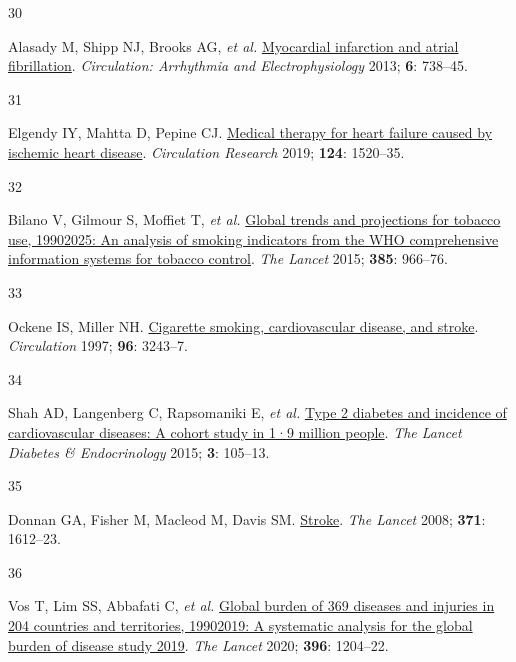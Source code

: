 \documentclass[
  a4paper,
  headsepline=true,
  open=any]{scrbook}
\newlength{\cslhangindent}
\newlength{\csllabelwidth}
\newlength{\cslentryspacingunit} %
\newenvironment{CSLReferences}[2] %
 {%
  \setlength{\parindent}{0pt}
  \ifodd #1
  \let\oldpar\par
  \def\par{\hangindent=\cslhangindent\oldpar}
  \fi
  \setlength{\parskip}{#2\cslentryspacingunit}
 }%
 {}
\newcommand{\CSLLeftMargin}[1]{\parbox[t]{\csllabelwidth}{#1}}
\newcommand{\CSLRightInline}[1]{\parbox[t]{\linewidth - \csllabelwidth}{#1}\break}
\begin{document}
\begin{CSLReferences}{0}{0}
\leavevmode{}%
\CSLLeftMargin{30 }%
\CSLRightInline{Alasady M, Shipp NJ, Brooks AG, \emph{et al.}
\href{https://doi.org/10.1161/CIRCEP.113.000163}{Myocardial infarction
and atrial fibrillation}. \emph{Circulation: Arrhythmia and
Electrophysiology} 2013; \textbf{6}: 738--45.}

\leavevmode{}%
\CSLLeftMargin{31 }%
\CSLRightInline{Elgendy IY, Mahtta D, Pepine CJ.
\href{https://doi.org/10.1161/CIRCRESAHA.118.313568}{Medical therapy for
heart failure caused by ischemic heart disease}. \emph{Circulation
Research} 2019; \textbf{124}: 1520--35.}

\leavevmode{}%
\CSLLeftMargin{32 }%
\CSLRightInline{Bilano V, Gilmour S, Moffiet T, \emph{et al.}
\href{https://doi.org/10.1016/S0140-6736(15)60264-1}{Global trends and
projections for tobacco use, 1990{\textendash}2025: An analysis of
smoking indicators from the WHO comprehensive information systems for
tobacco control}. \emph{The Lancet} 2015; \textbf{385}: 966--76.}

\leavevmode{}%
\CSLLeftMargin{33 }%
\CSLRightInline{Ockene IS, Miller NH.
\href{https://doi.org/10.1161/01.CIR.96.9.3243}{Cigarette smoking,
cardiovascular disease, and stroke}. \emph{Circulation} 1997;
\textbf{96}: 3243--7.}

\leavevmode{}%
\CSLLeftMargin{34 }%
\CSLRightInline{Shah AD, Langenberg C, Rapsomaniki E, \emph{et al.}
\href{https://doi.org/10.1016/S2213-8587(14)70219-0}{Type 2 diabetes and
incidence of cardiovascular diseases: A cohort study in 1·9 million
people}. \emph{The Lancet Diabetes \& Endocrinology} 2015; \textbf{3}:
105--13.}

\leavevmode{}%
\CSLLeftMargin{35 }%
\CSLRightInline{Donnan GA, Fisher M, Macleod M, Davis SM.
\href{https://doi.org/10.1016/S0140-6736(08)60694-7}{Stroke}. \emph{The
Lancet} 2008; \textbf{371}: 1612--23.}

\leavevmode{}%
\CSLLeftMargin{36 }%
\CSLRightInline{Vos T, Lim SS, Abbafati C, \emph{et al.}
\href{https://doi.org/10.1016/S0140-6736(20)30925-9}{Global burden of
369 diseases and injuries in 204 countries and territories,
1990{\textendash}2019: A systematic analysis for the global burden of
disease study 2019}. \emph{The Lancet} 2020; \textbf{396}: 1204--22.}


\end{CSLReferences}
\end{document}
